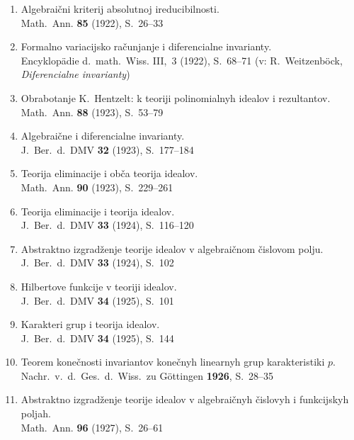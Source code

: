 \documentclass[11pt]{article}
\newcommand{\foreign}[1]{#1}
\begin{document}
\begin{enumerate}[label={\small\arabic*.},leftmargin=2em,itemsep=0.3em]
\item Algebraični kriterij absolutnoj ireducibilnosti.\\
\foreign{Math.\ Ann.} \textbf{85} (1922), S.~26--33

\item Formalno variacijsko računjanje i diferencialne invarianty.\\
\foreign{Encyklopädie d.\ math.\ Wiss.} III,\ 3 (1922), S.~68--71 (v:
\foreign{R.\ Weitzenböck}, \textit{Diferencialne invarianty})

\item Obrabotanje K.\ Hentzelt: k teoriji polinomialnyh idealov i rezultantov.\\
\foreign{Math.\ Ann.} \textbf{88} (1923), S.~53--79

\item Algebraične i diferencialne invarianty.\\
\foreign{J.\ Ber.\ d.\ DMV} \textbf{32} (1923), S.~177--184

\item Teorija eliminacije i obča teorija idealov.\\
\foreign{Math.\ Ann.} \textbf{90} (1923), S.~229--261

\item Teorija eliminacije i teorija idealov.\\
\foreign{J.\ Ber.\ d.\ DMV} \textbf{33} (1924), S.~116--120

\item Abstraktno izgradženje teorije idealov v algebraičnom čislovom polju.\\
\foreign{J.\ Ber.\ d.\ DMV} \textbf{33} (1924), S.~102

\item Hilbertove funkcije v teoriji idealov.\\
\foreign{J.\ Ber.\ d.\ DMV} \textbf{34} (1925), S.~101

\item Karakteri grup i teorija idealov.\\
\foreign{J.\ Ber.\ d.\ DMV} \textbf{34} (1925), S.~144

\item Teorem konečnosti invariantov konečnyh linearnyh grup karakteristiki $p$.\\
\foreign{Nachr.\ v.\ d.\ Ges.\ d.\ Wiss.\ zu Göttingen} \textbf{1926}, S.~28--35

\item Abstraktno izgradženje teorije idealov v algebraičnyh čislovyh i funkcijskyh poljah.\\
\foreign{Math.\ Ann.} \textbf{96} (1927), S.~26--61


\end{enumerate}
\end{document}

